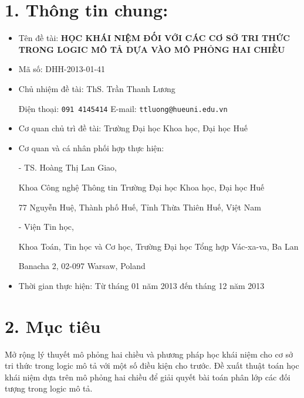 \section*{1. Thông tin chung:}
\begin{itemize}
	\item Tên đề tài: \textbf{HỌC KHÁI NIỆM ĐỐI VỚI CÁC CƠ SỞ TRI THỨC TRONG LOGIC MÔ TẢ DỰA VÀO MÔ PHỎNG HAI CHIỀU}\\[-0.8cm]
	\item Mã số: DHH-2013-01-41\\[-0.8cm]
	\item Chủ nhiệm đề tài: ThS. Trần Thanh Lương
	
	\vspace{-1.0ex}
	Điện thoại: \texttt{091 4145414} \qquad\qquad\qquad\qquad E-mail: \texttt{ttluong@hueuni.edu.vn}\\[-0.8cm]
	\item Cơ quan chủ trì đề tài: Trường Đại học Khoa học, Đại học Huế\\[-0.8cm]
	\item Cơ quan và cá nhân phối hợp thực hiện:
	
	- TS. Hoàng Thị Lan Giao,
	\vspace{-1.0ex}
	
	Khoa Công nghệ Thông tin Trường Đại học Khoa học, Đại học Huế
	\vspace{-1.0ex}
	
	77 Nguyễn Huệ, Thành phố Huế, Tỉnh Thừa Thiên Huế, Việt Nam
	
	- Viện Tin học,
	\vspace{-1.0ex}
	
	Khoa Toán, Tin học và Cơ học, Trường Đại học Tổng hợp Vác-xa-va, Ba Lan
	
	\vspace{-1.0ex}
	Banacha 2, 02-097 Warsaw, Poland\\[-0.8cm]
	
	\item Thời gian thực hiện: Từ tháng 01 năm 2013 đến tháng 12 năm 2013
\end{itemize}
\section*{2. Mục tiêu}
Mở rộng lý thuyết mô phỏng hai chiều và phương pháp học khái niệm cho cơ sở tri thức trong logic mô tả với một số điều kiện cho trước.
Đề xuất thuật toán học khái niệm dựa trên mô phỏng hai chiều để giải quyết bài toán phân lớp các đối tượng trong logic mô tả.

